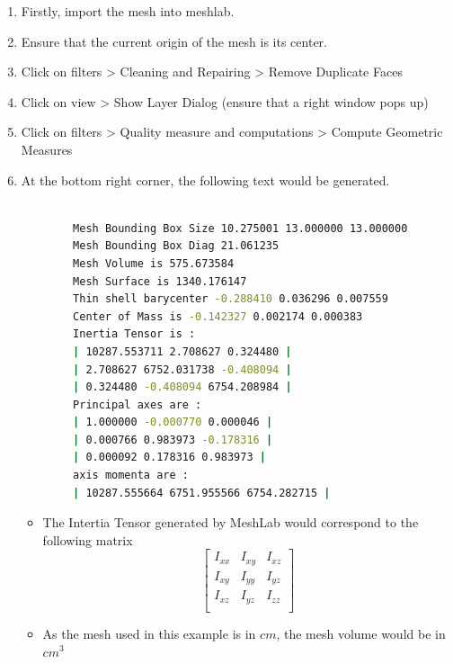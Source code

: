 \documentclass[11pt]{article}
\begin{document}
\begin{enumerate}
 \item {Firstly, import the mesh into meshlab.}
 \item{Ensure that the current origin of the mesh is its center.}
 \item{ Click on filters > Cleaning and Repairing > Remove Duplicate Faces}
 \item{ Click on view > Show Layer Dialog (ensure that a right window pops up)}
 \item {Click on filters > Quality measure and computations > Compute Geometric Measures}
 \item {
       At the bottom right corner, the following text would be generated.
       \begin{lstlisting}[language=bash]

        Mesh Bounding Box Size 10.275001 13.000000 13.000000
        Mesh Bounding Box Diag 21.061235
        Mesh Volume is 575.673584
        Mesh Surface is 1340.176147
        Thin shell barycenter -0.288410 0.036296 0.007559
        Center of Mass is -0.142327 0.002174 0.000383
        Inertia Tensor is :
        | 10287.553711 2.708627 0.324480 |
        | 2.708627 6752.031738 -0.408094 |
        | 0.324480 -0.408094 6754.208984 |
        Principal axes are :
        | 1.000000 -0.000770 0.000046 |
        | 0.000766 0.983973 -0.178316 |
        | 0.000092 0.178316 0.983973 |
        axis momenta are :
        | 10287.555664 6751.955566 6754.282715 |

       \end{lstlisting}
       \begin{itemize}
        \item {
              The Intertia Tensor generated by MeshLab would correspond to the following matrix
              $$
               \begin{bmatrix}
                I_{xx} & I_{xy} & I_{xz} \\
                I_{xy} & I_{yy} & I_{yz} \\
                I_{xz} & I_{yz} & I_{zz} \\
               \end{bmatrix}
              $$
              }
        \item{
              As the mesh used in this example is in $cm$, the mesh volume would be in ${cm}^3$
              }
       \end{itemize}

       }
\end{enumerate}
\end{document}
